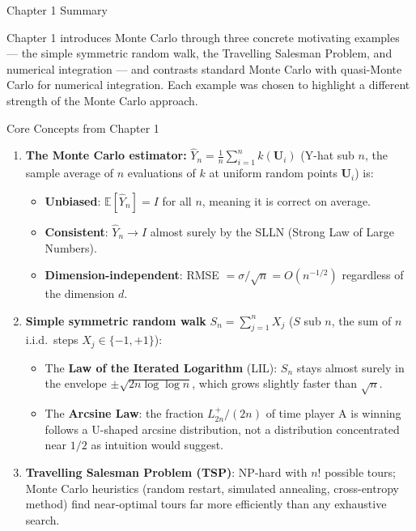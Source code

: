 \documentclass[aspectratio=169,10pt]{beamer}
\begin{document}
\begin{frame}[allowframebreaks]{Chapter 1 Summary}

  Chapter 1 introduces Monte Carlo through three concrete motivating examples
  --- the simple symmetric random walk, the Travelling Salesman Problem, and
  numerical integration --- and contrasts standard Monte Carlo with quasi-Monte
  Carlo for numerical integration.  Each example was chosen to highlight a
  different strength of the Monte Carlo approach.

  \begin{block}{Core Concepts from Chapter 1}
    \begin{enumerate}
      \item \textbf{The Monte Carlo estimator:}
        $\hat{Y}_n = \frac{1}{n}\sum_{i=1}^n k(\mathbf{U}_i)$
        (Y-hat sub $n$, the sample average of $n$ evaluations of $k$ at uniform
        random points $\mathbf{U}_i$) is:
        \begin{itemize}
          \item \textbf{Unbiased}: $\mathbb{E}[\hat{Y}_n] = I$ for all $n$,
            meaning it is correct on average.
          \item \textbf{Consistent}: $\hat{Y}_n \to I$ almost surely by the
            SLLN (Strong Law of Large Numbers).
          \item \textbf{Dimension-independent}: RMSE $= \sigma/\sqrt{n} =
            O(n^{-1/2})$ regardless of the dimension $d$.
        \end{itemize}

      \item \textbf{Simple symmetric random walk} $S_n = \sum_{j=1}^n X_j$
        ($S$ sub $n$, the sum of $n$ i.i.d.\ steps $X_j \in \{-1, +1\}$):
        \begin{itemize}
          \item The \textbf{Law of the Iterated Logarithm} (LIL): $S_n$ stays
            almost surely in the envelope $\pm\sqrt{2n\log\log n}$, which grows
            slightly faster than $\sqrt{n}$.
          \item The \textbf{Arcsine Law}: the fraction $L^+_{2n}/(2n)$ of time
            player A is winning follows a U-shaped arcsine distribution, not a
            distribution concentrated near $1/2$ as intuition would suggest.
        \end{itemize}

      \item \textbf{Travelling Salesman Problem (TSP)}: NP-hard with $n!$
        possible tours; Monte Carlo heuristics (random restart, simulated
        annealing, cross-entropy method) find near-optimal tours far more
        efficiently than any exhaustive search.


\end{enumerate}
\end{block}
\end{frame}
\end{document}
